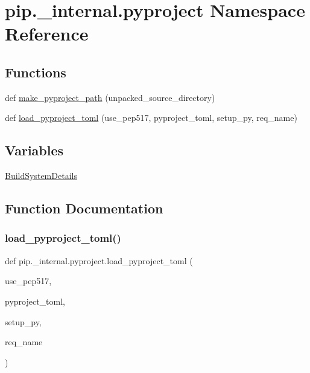 \hypertarget{namespacepip_1_1__internal_1_1pyproject}{}\section{pip.\+\_\+internal.\+pyproject Namespace Reference}
\label{namespacepip_1_1__internal_1_1pyproject}
\subsection*{Functions}
\begin{DoxyCompactItemize}
\item 
def \hyperlink{namespacepip_1_1__internal_1_1pyproject_aa0250284deda8acb0915feb29cbf0fc9}{make\+\_\+pyproject\+\_\+path} (unpacked\+\_\+source\+\_\+directory)
\item 
def \hyperlink{namespacepip_1_1__internal_1_1pyproject_a0bee1804548f06cf5055d85e5b2509d3}{load\+\_\+pyproject\+\_\+toml} (use\+\_\+pep517, pyproject\+\_\+toml, setup\+\_\+py, req\+\_\+name)
\end{DoxyCompactItemize}
\subsection*{Variables}
\begin{DoxyCompactItemize}
\item 
\hyperlink{namespacepip_1_1__internal_1_1pyproject_a274d06001ee00ebc1024f50fe1cc1d05}{Build\+System\+Details}
\end{DoxyCompactItemize}


\subsection{Function Documentation}
\mbox{\label{namespacepip_1_1__internal_1_1pyproject_a0bee1804548f06cf5055d85e5b2509d3}} 
\subsubsection{\texorpdfstring{load\+\_\+pyproject\+\_\+toml()}{load\_pyproject\_toml()}}
{\footnotesize\ttfamily def pip.\+\_\+internal.\+pyproject.\+load\+\_\+pyproject\+\_\+toml (\begin{DoxyParamCaption}\item[{}]{use\+\_\+pep517,  }\item[{}]{pyproject\+\_\+toml,  }\item[{}]{setup\+\_\+py,  }\item[{}]{req\+\_\+name }\end{DoxyParamCaption})}

